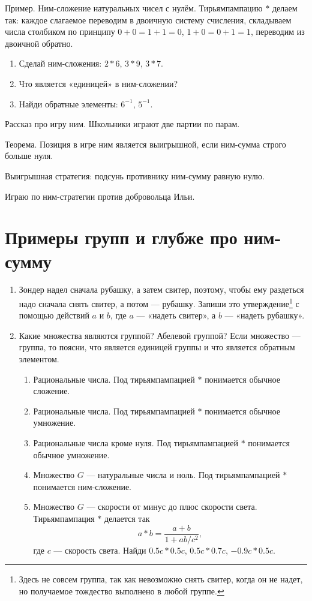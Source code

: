 \documentclass[12pt]{article} %
\begin{document}
Пример. Ним-сложение натуральных чисел с нулём. Тирьямпампацию $*$ делаем так: каждое слагаемое переводим в двоичную систему счисления, складываем числа столбиком по принципу $0+0=1+1=0$, $1+0=0+1=1$, переводим из двоичной обратно.

\begin{enumerate}[start=4]
  \item Сделай ним-сложения: $2 * 6$, $3 * 9$, $3 * 7$.
  \item Что является «единицей» в ним-сложении?
  \item Найди обратные элементы: $6^{-1}$, $5^{-1}$.
\end{enumerate}

Рассказ про игру ним. Школьники играют две партии по парам.

Теорема. Позиция в игре ним является выигрышной, если ним-сумма строго больше нуля.

Выигрышная стратегия: подсунь противнику ним-сумму равную нулю.

Играю по ним-стратегии против добровольца Ильи.

\newpage
\section{Примеры групп и глубже про ним-сумму}

\begin{enumerate}
\item Зондер надел сначала рубашку, а затем свитер, поэтому, чтобы ему раздеться надо сначала снять свитер, а потом — рубашку. Запиши это утверждение\footnote{Здесь не совсем группа, так как невозможно снять свитер, когда он не надет, но получаемое тождество выполнено в любой группе.} с помощью действий $a$ и $b$, где $a$ — «надеть свитер», а $b$ — «надеть рубашку».

\item Какие множества являются группой? Абелевой группой? Если множество — группа, то поясни, что является единицей группы и что является обратным элементом.
\begin{enumerate}
\item Рациональные числа. Под тирьямпампацией $*$ понимается обычное сложение.
\item Рациональные числа. Под тирьямпампацией $*$ понимается обычное умножение.
\item Рациональные числа кроме нуля. Под тирьямпампацией $*$ понимается обычное умножение.
\item Множество $G$ — натуральные числа и ноль. Под тирьямпампацией $*$ понимается ним-сложение.
\item Множество $G$ — скорости от минус до плюс скорости света. Тирьямпампация $*$ делается так
\[
a * b = \frac{a + b}{1 + ab/c^2},
\]
где $c$ — скорость света. Найди $0.5c * 0.5c$, $0.5c * 0.7c$, $-0.9c * 0.5c$.

\end{enumerate}
\end{enumerate}
\end{document}
